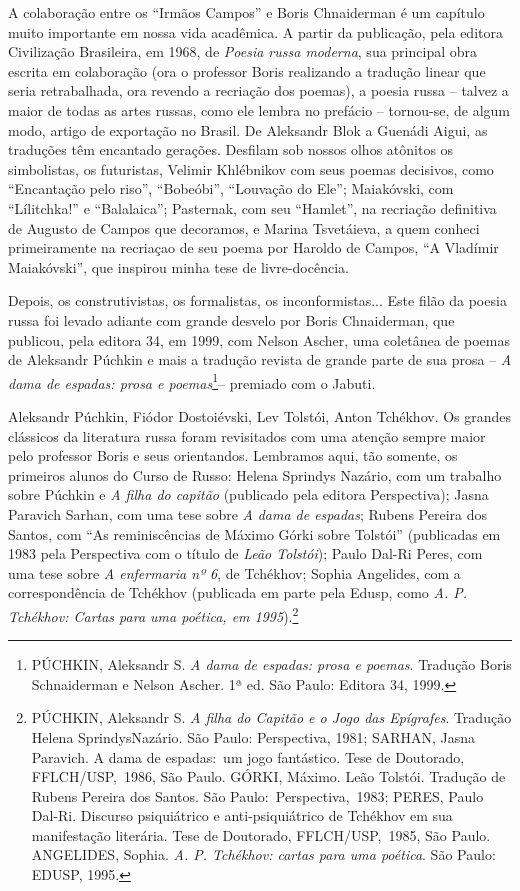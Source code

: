 A colaboração entre os ``Irmãos Campos'' e Boris Chnaiderman é um
capítulo muito importante em nossa vida acadêmica. A partir da
publicação, pela editora Civilização Brasileira, em 1968, de
\emph{Poesia russa moderna}, sua principal obra escrita em colaboração
(ora o professor Boris realizando a tradução linear que seria
retrabalhada, ora revendo a recriação dos poemas), a poesia russa --
talvez a maior de todas as artes russas, como ele lembra no prefácio --
tornou-se, de algum modo, artigo de exportação no Brasil. De Aleksandr
Blok a Guenádi Aigui, as traduções têm encantado gerações. Desfilam sob
nossos olhos atônitos os simbolistas, os futuristas, Velimir Khlébnikov
com seus poemas decisivos, como ``Encantação pelo riso'', ``Bobeóbi'',
``Louvação do Ele''; Maiakóvski, com ``Lílitchka!'' e ``Balalaica'';
Pasternak, com seu ``Hamlet'', na recriação definitiva de Augusto de
Campos que decoramos, e Marina Tsvetáieva, a quem conheci primeiramente
na recriaçao de seu poema por Haroldo de Campos, ``A Vladímir
Maiakóvski'', que inspirou minha tese de livre-docência.

Depois, os construtivistas, os formalistas, os inconformistas... Este
filão da poesia russa foi levado adiante com grande desvelo por Boris
Chnaiderman, que publicou, pela editora 34, em 1999, com Nelson Ascher,
uma coletânea de poemas de Aleksandr Púchkin e mais a tradução revista
de grande parte de sua prosa -- \emph{A dama de espadas: prosa e
poemas}\footnote{PÚCHKIN, Aleksandr S. \emph{A dama de espadas: prosa e
  poemas}. Tradução Boris Schnaiderman e Nelson Ascher. 1ª ed. São
  Paulo: Editora 34, 1999.}-- premiado com o Jabuti.

Aleksandr Púchkin, Fiódor Dostoiévski, Lev Tolstói, Anton Tchékhov. Os
grandes clássicos da literatura russa foram revisitados com uma atenção
sempre maior pelo professor Boris e seus orientandos. Lembramos aqui,
tão somente, os primeiros alunos do Curso de Russo: Helena Sprindys
Nazário, com um trabalho sobre Púchkin e \emph{A filha do capitão}
(publicado pela editora Perspectiva); Jasna Paravich Sarhan, com uma
tese sobre \emph{A} \emph{dama de espadas}; Rubens Pereira dos Santos,
com ``As reminiscências de Máximo Górki sobre Tolstói'' (publicadas em
1983 pela Perspectiva com o título de \emph{Leão Tolstói}); Paulo Dal-Ri
Peres, com uma tese sobre \emph{A enfermaria nº 6}, de Tchékhov; Sophia
Angelides, com a correspondência de Tchékhov (publicada em parte pela
Edusp, como \emph{A. P. Tchékhov: Cartas para uma poética, em
1995}).\footnote{PÚCHKIN, Aleksandr S. \emph{A filha do Capitão e o Jogo
  das Epígrafes}. Tradução Helena SprindysNazário. São Paulo:
  Perspectiva, 1981; SARHAN, Jasna Paravich. A dama de espadas:~um jogo
  fantástico. Tese de Doutorado, FFLCH/USP,~1986, São Paulo. GÓRKI,
  Máximo. Leão Tolstói. Tradução de Rubens Pereira dos Santos. São
  Paulo:~Perspectiva,~1983; PERES, Paulo Dal-Ri. Discurso psiquiátrico e
  anti-psiquiátrico de Tchékhov em sua manifestação literária. Tese de
  Doutorado, FFLCH/USP,~1985, São Paulo. ANGELIDES, Sophia. \emph{A. P.
  Tchékhov: cartas para uma poética}. São Paulo: EDUSP, 1995.}

